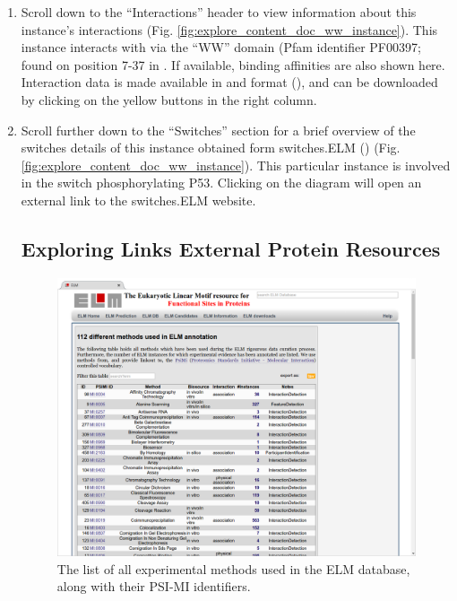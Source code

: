 \begin{enumerate}
\item Scroll down to the ``Interactions'' header to view information about this
	instance's interactions
	(Fig.  \ref{fig:explore_content_doc_ww_instance}). This instance
	interacts with  via the ``WW'' domain (Pfam identifier
	PF00397; found on position 7-37 in . If available,
	binding affinities are also shown here. Interaction data is made
	available in  and  format
	(\cite{17925023}), and can be downloaded by clicking on the yellow
	buttons in the right column.

\item Scroll further down to the ``Switches'' section for a brief overview of
	the switches details of this instance obtained form switches.ELM
	(\cite{23550212}) (Fig. \ref{fig:explore_content_doc_ww_instance}). This
	particular instance is involved in the switch phosphorylating P53.
	Clicking on the diagram will open an external link to the
	switches.ELM website.

%
%
\subsection{Exploring Links External Protein Resources}
\label{subsec:explore_content_links_to_external_resources}

\begin{figure}[h!]
	\centering
	\includegraphics[width=\textwidth]{Figures/explore_content/methods.png} 
	\caption{
		The list of all experimental methods used in the ELM database,
		along with their PSI-MI identifiers.
	}
	\label{fig:explore_content_methods}
\end{figure}


\end{enumerate}
